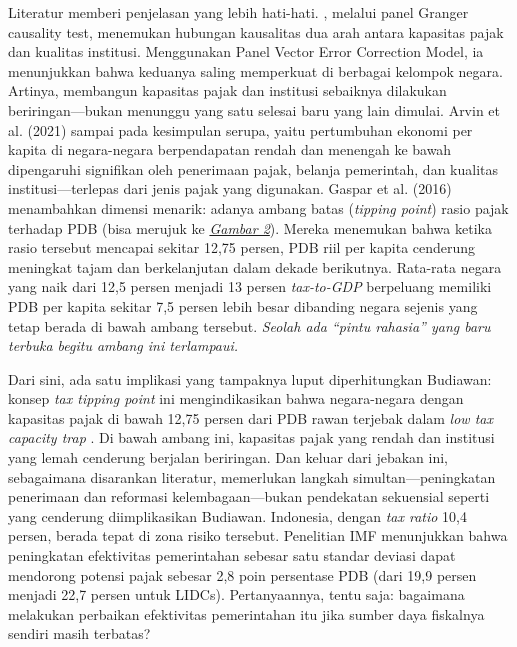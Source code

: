 Literatur memberi penjelasan yang lebih hati-hati. \citet{akanbi_2019_state}, melalui panel Granger causality test, menemukan hubungan kausalitas dua arah antara kapasitas pajak dan kualitas institusi. Menggunakan Panel Vector Error Correction Model, ia menunjukkan bahwa keduanya saling memperkuat di berbagai kelompok negara. Artinya, membangun kapasitas pajak dan institusi sebaiknya dilakukan beriringan—bukan menunggu yang satu selesai baru yang lain dimulai.  Arvin et al. (2021) sampai pada kesimpulan serupa, yaitu pertumbuhan ekonomi per kapita di negara-negara berpendapatan rendah dan menengah ke bawah dipengaruhi signifikan oleh penerimaan pajak, belanja pemerintah, dan kualitas institusi—terlepas dari jenis pajak yang digunakan.  Gaspar et al. (2016) menambahkan dimensi menarik: adanya ambang batas (\textit{tipping point}) rasio pajak terhadap PDB (bisa merujuk ke \textit{\hyperref[fig:view]{Gambar 2}}). Mereka menemukan bahwa ketika rasio tersebut mencapai sekitar 12,75 persen, PDB riil per kapita cenderung meningkat tajam dan berkelanjutan dalam dekade berikutnya. Rata-rata negara yang naik dari 12,5 persen menjadi 13 persen \textit{tax-to-GDP} berpeluang memiliki PDB per kapita sekitar 7,5 persen lebih besar dibanding negara sejenis yang tetap berada di bawah ambang tersebut. \textit{Seolah ada “pintu rahasia” yang baru terbuka begitu ambang ini terlampaui.}

Dari sini, ada satu implikasi yang tampaknya luput diperhitungkan Budiawan: konsep \textit{tax tipping point} ini mengindikasikan bahwa negara-negara dengan kapasitas pajak di bawah 12,75 persen dari PDB rawan terjebak dalam \textit{low tax capacity trap} \citep{akanbi_2019_state}. Di bawah ambang ini, kapasitas pajak yang rendah dan institusi yang lemah cenderung berjalan beriringan. Dan keluar dari jebakan ini, sebagaimana disarankan literatur, memerlukan langkah simultan—peningkatan penerimaan dan reformasi kelembagaan—bukan pendekatan sekuensial seperti yang cenderung diimplikasikan Budiawan. Indonesia, dengan \textit{tax ratio} 10,4 persen, berada tepat di zona risiko tersebut. Penelitian IMF menunjukkan bahwa peningkatan efektivitas pemerintahan sebesar satu standar deviasi dapat mendorong potensi pajak sebesar 2,8 poin persentase PDB (dari 19,9 persen menjadi 22,7 persen untuk LIDCs). Pertanyaannya, tentu saja: bagaimana melakukan perbaikan efektivitas pemerintahan itu jika sumber daya fiskalnya sendiri masih terbatas?

